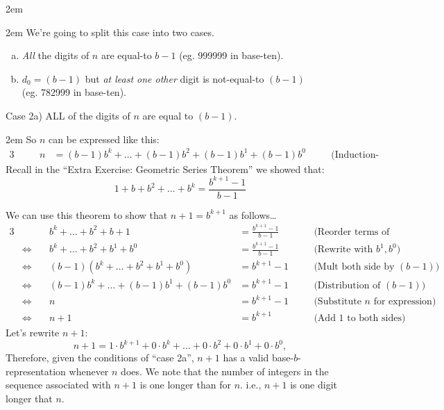 \documentclass{article}
\newenvironment{jprIn}{\begin{adjustwidth}{2em}{}}{\end{adjustwidth}}
\begin{document}
\begin{jprIn}
\begin{jprIn}
We're going to split this case into two cases.

\begin{enumerate}[a)]
\item \emph{All} the digits of $n$ are equal-to $b{-}1$ (eg. 999999 in base-ten).
\item $d_0=(b-1)$ but \emph{at least one other} digit is not-equal-to $(b-1)$\\
(eg. 782999 in base-ten).
\end{enumerate}
%

Case 2a) ALL of the digits of $n$ are equal to $(b-1)$.
\begin{jprIn}
So $n$ can be expressed like this:
\begin{alignat*}{3}
  &\quad&n
  &= (b{-}1)b^k+\dots{}+(b{-}1)b^2+(b{-}1)b^1+(b{-}1)b^0 &&\quad\text{(Induction-Assumption)}
\end{alignat*}
Recall in the ``Extra Exercise: Geometric Series Theorem''
we showed that:
\[1+b+b^2+\dots{}+b^k=\frac{b^{k+1}-1}{b-1}\]

We can use this theorem to show that $n+1=b^{k+1}$ as follows\dots
\smallskip
{\small
\begin{alignat*}{3}
  &&b^k+\dots{}+b^2+b+1
  &= \frac{b^{k+1}-1}{b-1} &&\quad\text{(Reorder terms of G.S.Thm.)}\\
  &\Leftrightarrow\quad
  &b^k+\dots{}+b^2+b^1+b^0
  &= \frac{b^{k+1}-1}{b-1} &&\quad\text{(Rewrite with }b^1, b^0\text{)}\\
  &\Leftrightarrow\quad
  &(b-1)(b^k+\dots{}+b^2+b^1+b^0)
  &= b^{k+1}-1 &&\quad\text{(Mult both side by }(b{-}1)\text{)}\\
  &\Leftrightarrow\quad
  &(b{-}1)b^k+\dots{}+(b{-}1)b^1+(b{-}1)b^0
  &= b^{k+1}-1 &&\quad\text{(Distribution of }(b{-}1)\text{)}\\
  &\Leftrightarrow\quad
  &n
  &= b^{k+1}-1 &&\quad\text{(Substitute }n\text{ for expression)}\\
  &\Leftrightarrow\quad
  &n+1
  &= b^{k+1} &&\quad\text{(Add 1 to both sides)}
\end{alignat*}
}Let's rewrite $n+1$:
\[n+1= 1\cdot{}b^{k+1}+0\cdot{}b^{k}+\dots{}+0\cdot{}b^2+0\cdot{}b^1+0\cdot{}b^0,\]
Therefore, given the conditions of ``case 2a'', $n+1$ has
a valid base-$b$-representation whenever $n$ does.
We note that
the number of integers in the sequence associated
with $n+1$ is one longer than for $n$. i.e., $n+1$ is one digit longer that $n$.


\end{jprIn}
\end{jprIn}
\end{jprIn}
\end{document}

